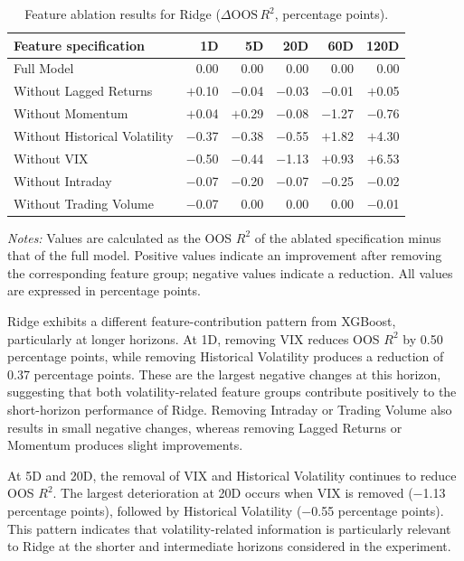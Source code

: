 \documentclass[12pt,twoside]{ord}
\begin{document}
\begin{table}[htbp]
\centering
\caption{Feature ablation results for Ridge ($\Delta \mathrm{OOS}\,R^2$, percentage points).}\label{tab:ablation_ridge}
{\footnotesize
\setlength{\tabcolsep}{6pt}
\begin{tabular}{lrrrrr}
\hline
Feature specification & 1D & 5D & 20D & 60D & 120D \\
\hline
Full Model & 0.00 & 0.00 & 0.00 & 0.00 & 0.00 \\
Without Lagged Returns & $+$0.10 & $-$0.04 & $-$0.03 & $-$0.01 & $+$0.05 \\
Without Momentum & $+$0.04 & $+$0.29 & $-$0.08 & $-$1.27 & $-$0.76 \\
Without Historical Volatility & $-$0.37 & $-$0.38 & $-$0.55 & $+$1.82 & $+$4.30 \\
Without VIX & $-$0.50 & $-$0.44 & $-$1.13 & $+$0.93 & $+$6.53 \\
Without Intraday & $-$0.07 & $-$0.20 & $-$0.07 & $-$0.25 & $-$0.02 \\
Without Trading Volume & $-$0.07 & 0.00 & 0.00 & 0.00 & $-$0.01 \\
\hline
\end{tabular}
}
\par\vspace{4pt}\parbox{\linewidth}{\fontsize{9pt}{12pt}\selectfont\textit{Notes:} Values are calculated as the OOS $R^2$ of the ablated specification minus that of the full model. Positive values indicate an improvement after removing the corresponding feature group; negative values indicate a reduction. All values are expressed in percentage points.}
\end{table}

Ridge exhibits a different feature-contribution pattern from XGBoost, particularly at longer horizons. At 1D, removing VIX reduces OOS $R^2$ by 0.50 percentage points, while removing Historical Volatility produces a reduction of 0.37 percentage points. These are the largest negative changes at this horizon, suggesting that both volatility-related feature groups contribute positively to the short-horizon performance of Ridge. Removing Intraday or Trading Volume also results in small negative changes, whereas removing Lagged Returns or Momentum produces slight improvements.

At 5D and 20D, the removal of VIX and Historical Volatility continues to reduce OOS $R^2$. The largest deterioration at 20D occurs when VIX is removed ($-$1.13 percentage points), followed by Historical Volatility ($-$0.55 percentage points). This pattern indicates that volatility-related information is particularly relevant to Ridge at the shorter and intermediate horizons considered in the experiment.
\end{document}
